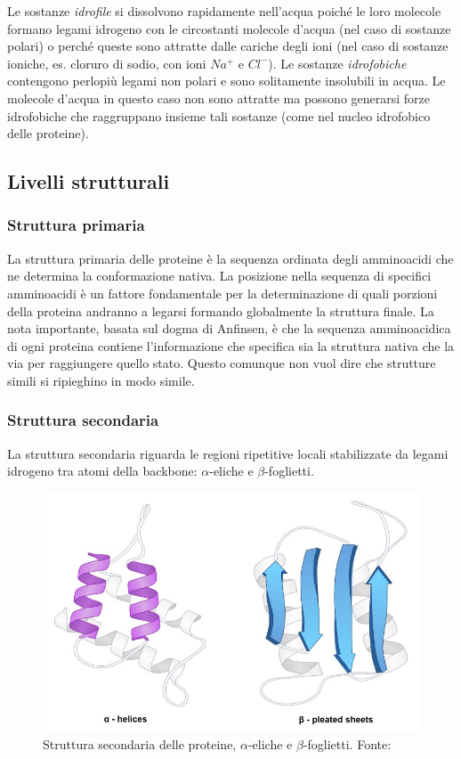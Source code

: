 {{\begin{itemize}
	Le sostanze \textit{idrofile} si dissolvono rapidamente nell'acqua poiché le loro molecole formano legami idrogeno con le circostanti molecole d'acqua (nel caso di sostanze polari) o perché queste sono attratte dalle cariche degli ioni (nel caso di sostanze ioniche, es. cloruro di sodio, con ioni $Na^{+}$ e $Cl^{-}$). Le sostanze \textit{idrofobiche} contengono perlopiù legami non polari e sono solitamente insolubili in acqua. Le molecole d'acqua in questo caso non sono attratte ma possono generarsi forze idrofobiche che raggruppano insieme tali sostanze (come nel nucleo idrofobico delle proteine).
\end{itemize}
}

\subsection{Livelli strutturali}
\subsubsection{Struttura primaria}
La struttura primaria delle proteine è la sequenza ordinata degli amminoacidi che ne determina la conformazione nativa. La posizione nella sequenza di specifici amminoacidi è un fattore fondamentale per la determinazione di quali porzioni della proteina andranno a legarsi formando globalmente la struttura finale. La nota importante, basata sul dogma di Anfinsen, è che la sequenza amminoacidica di ogni proteina contiene l'informazione che specifica sia la struttura nativa che la via per raggiungere quello stato. Questo comunque non vuol dire che strutture simili si ripieghino in modo simile.
	
\subsubsection{Struttura secondaria}
{
La struttura secondaria riguarda le regioni ripetitive locali stabilizzate da legami idrogeno tra atomi della backbone: $\alpha$-eliche e $\beta$-foglietti.

\begin{figure}[h]
	\centering
	\includegraphics[scale=0.4]{images/secondary.jpeg}
	\caption{Struttura secondaria delle proteine, $\alpha$-eliche e $\beta$-foglietti. Fonte: \cite{proteinStrucBioNinja}}
	\label{fig:struttura-secondaria}
\end{figure}

}}
